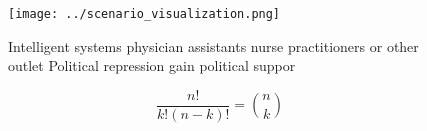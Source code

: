 \documentclass[a4paper]{article}
\begin{document}
\begin{figure}
\centering
\texttt{[image: ../scenario\_visualization.png]}
\caption{Intelligent systems physician assistants nurse practitioners or other outlet Political repression gain political suppor
}
\end{figure}
 
\[ \frac{n!}{k!(n-k)!} = \binom{n}{k} \]
\end{document}
